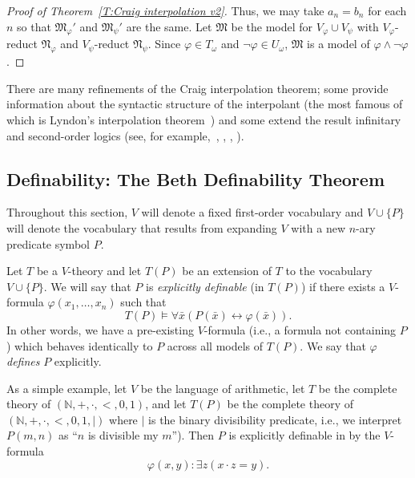 \documentclass{scrartcl}
\renewcommand{\phi}{\varphi}
\newcommand{\FM}{\mathfrak{M}}
\newcommand{\FN}{\mathfrak{N}}
\begin{document}
\begin{proof}[Proof of Theorem~\ref{T:Craig interpolation v2}]
Thus, we may take $a_n=b_n$ for each $n$ so that $\FM_\phi'$ and $\FM_\psi '$ are the same. Let $\FM$ be the model for $V_\phi\cup V_\psi$ with $V_\phi$-reduct $\FN_\phi$ and $V_\psi$-reduct $\FN_\psi$. Since $\phi\in T_\omega$ and $\neg \phi\in U_\omega$, $\FM$ is a model of $\phi\wedge\neg\phi$.
\end{proof}

There are many refinements of the Craig interpolation theorem; some provide information about the syntactic structure  of the interpolant (the most famous of which is Lyndon's interpolation theorem~\cite{Lyndon:1963}) and some extend the result infinitary and second-order logics (see, for example,~\cite{Lopez-Escobar:1965}, \cite{Malitz:1969}, \cite{Keisler:1971}, \cite{Chang:1971}).


\subsection{Definability: The Beth Definability Theorem}

Throughout this section, $V$ will denote a fixed first-order vocabulary and $V\cup\{P\}$ will denote the vocabulary that results from expanding $V$ with a new $n$-ary predicate symbol $P$. 

\begin{definition}
Let $T$ be a $V$-theory and let $T(P)$ be an extension of $T$ to the vocabulary $V\cup\{P\}$.
We will say that $P$ is \emph{explicitly definable} (in $T(P)$) if there exists a $V$-formula $\varphi(x_1,\dots, x_n)$ such that
\[
T(P)\models\forall\bar{x}\left(P(\bar{x})\leftrightarrow\phi(\bar{x})\right).
\]
In other words, we have a pre-existing $V$-formula (i.e., a formula not containing $P$) which behaves identically to $P$ across all models of $T(P)$. We say that $\phi$ \emph{defines} $P$ explicitly. 
\end{definition}


As a simple example, let $V$ be the language of arithmetic, let $T$ be the complete theory of $(\mathbb{N}, +,\cdot, <,0,1)$, and let $T(P)$  be the complete theory of $(\mathbb{N}, +,\cdot, <,0,1, \mid)$ where  $\mid$ is the binary divisibility predicate, i.e., we interpret $P(m,n)$ as ``$n$ is divisible my $m$''). Then $P$ is explicitly definable in by the $V$-formula 
\[
\phi(x,y):\exists z(x\cdot z=y).
\]
\end{document}

